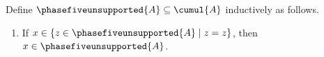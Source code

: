 \begin{inductive}\label{phase5_nested_unsupported_context}
    Define $\phasefiveunsupported{A}\subseteq\cumul{A}$ inductively as follows.
    \begin{enumerate}
        \item If $x\in\{z\in\phasefiveunsupported{A}\mid z=z\}$, then
            $x\in\phasefiveunsupported{A}$.
    \end{enumerate}
\end{inductive}

